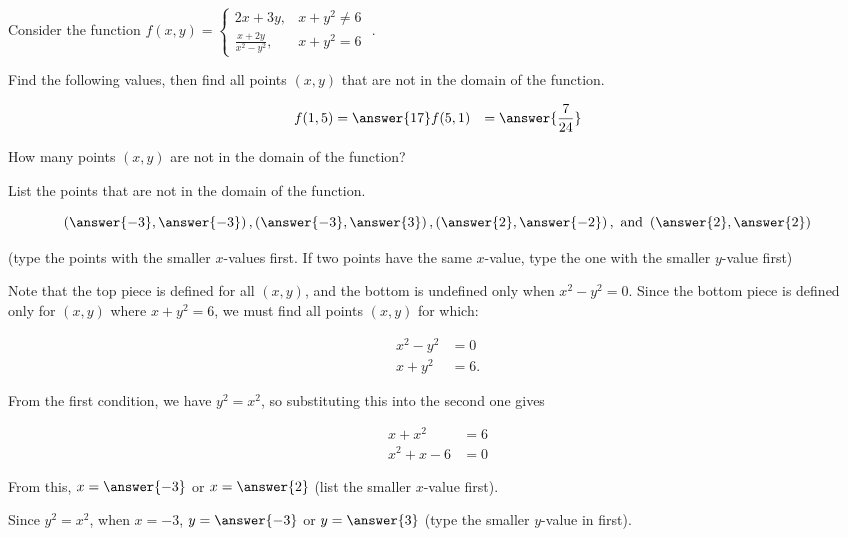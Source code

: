 \documentclass{ximera}
\author{Jim Talamo}
\begin{document}
\begin{exercise}
Consider the function $f(x,y) =  \begin{cases} 2x+3y , & x+y^2 \neq 6 \\ \frac{x+2y}{x^2-y^2} , & x+y^2=6 \end{cases} $ . 

Find the following values, then find all points $(x,y)$ that are not in the domain of the function.

\begin{align*}
f(1,5) &= \answer{17}
f(5,1) &= \answer{\frac{7}{24}}
\end{align*}

How many points $(x,y)$ are not in the domain of the function?

\begin{multipleChoice}
\end{multipleChoice}

\begin{exercise}
List the points that are not in the domain of the function.

\[
\left( \answer{-3}, \answer{-3}\right) , \left( \answer{-3}, \answer{3} \right) , \left( \answer{2}, \answer{-2} \right) , \textrm{ and } \left(\answer{2}, \answer{2} \right)
\]

(type the points with the smaller $x$-values first.  If two points have the same $x$-value, type the one with the smaller $y$-value first)


\begin{hint}
Note that the top piece is defined for all $(x,y)$, and the bottom is undefined only when $x^2-y^2=0$.  Since the bottom piece is defined only for $(x,y)$ where $x+y^2=6$, we must find all points $(x,y)$ for which:

\begin{align}
x^2-y^2&=0 \\
x+y^2&=6.
\end{align}

From the first condition, we have $y^2=x^2$, so substituting this into the second one gives

\begin{align*}
x+x^2 &=6 \\
x^2+x-6 &= 0
\end{align*}

From this, $x=\answer{-3}$ or $x=\answer{2}$ (list the smaller $x$-value first).

Since $y^2=x^2$, when $x=-3$, $y= \answer{-3}$ or $y=\answer{3}$ (type the smaller $y$-value in first).

\end{hint}
\end{exercise}


\end{exercise}
\end{document}
